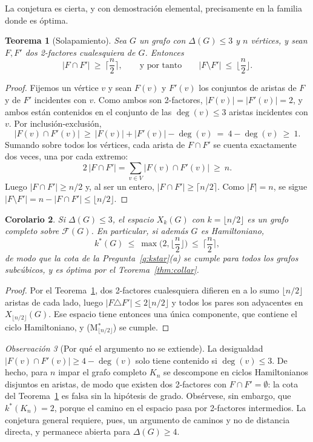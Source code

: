 \documentclass[11pt,a4paper]{article}
\newtheorem{teorema}{Teorema}[section]
\newtheorem{corolario}[teorema]{Corolario}
\theoremstyle{definition}
\theoremstyle{remark}
\newtheorem{observacion}[teorema]{Observación}
\begin{document}
La conjetura es cierta, y con demostración elemental, precisamente en la familia donde es óptima.

\begin{teorema}[Solapamiento]\label{thm:solape}
Sea $G$ un grafo con $\Delta(G)\le3$ y $n$ vértices, y sean $F,F'$ dos 2-factores cualesquiera de $G$. Entonces
\[
|F\cap F'|\ \ge\ \Big\lceil \frac n2\Big\rceil,
\qquad\text{y por tanto}\qquad
|F\setminus F'|\ \le\ \Big\lfloor \frac n2\Big\rfloor .
\]
\end{teorema}

\begin{proof}
Fijemos un vértice $v$ y sean $F(v)$ y $F'(v)$ los conjuntos de aristas de $F$ y de $F'$ incidentes con $v$. Como ambos son 2-factores, $|F(v)|=|F'(v)|=2$, y ambos están contenidos en el conjunto de las $\deg(v)\le3$ aristas incidentes con $v$. Por inclusión-exclusión,
\[
|F(v)\cap F'(v)|\ \ge\ |F(v)|+|F'(v)|-\deg(v)\ =\ 4-\deg(v)\ \ge\ 1 .
\]
Sumando sobre todos los vértices, cada arista de $F\cap F'$ se cuenta exactamente dos veces, una por cada extremo:
\[
2\,|F\cap F'|=\sum_{v\in V}|F(v)\cap F'(v)|\ \ge\ n .
\]
Luego $|F\cap F'|\ge n/2$ y, al ser un entero, $|F\cap F'|\ge\lceil n/2\rceil$. Como $|F|=n$, se sigue $|F\setminus F'|=n-|F\cap F'|\le\lfloor n/2\rfloor$.
\end{proof}

\begin{corolario}\label{cor:subcubico}
Si $\Delta(G)\le3$, el espacio $X_k(G)$ con $k=\lfloor n/2\rfloor$ es un grafo completo sobre $\mathcal{F}(G)$. En particular, si además $G$ es Hamiltoniano,
\[
k^*(G)\ \le\ \max\Big(2,\Big\lfloor\frac n2\Big\rfloor\Big)\ \le\ \Big\lceil\frac n2\Big\rceil ,
\]
de modo que la cota de la Pregunta~\ref{q:kstar}(a) se cumple para todos los grafos subcúbicos, y es óptima por el Teorema~\ref{thm:collar}.
\end{corolario}

\begin{proof}
Por el Teorema~\ref{thm:solape}, dos 2-factores cualesquiera difieren en a lo sumo $\lfloor n/2\rfloor$ aristas de cada lado, luego $|F\triangle F'|\le2\lfloor n/2\rfloor$ y todos los pares son adyacentes en $X_{\lfloor n/2\rfloor}(G)$. Ese espacio tiene entonces una única componente, que contiene el ciclo Hamiltoniano, y (M$^*_{\lfloor n/2\rfloor}$) se cumple.
\end{proof}

\begin{observacion}[Por qué el argumento no se extiende]
La desigualdad $|F(v)\cap F'(v)|\ge4-\deg(v)$ solo tiene contenido si $\deg(v)\le3$. De hecho, para $n$ impar el grafo completo $K_n$ se descompone en ciclos Hamiltonianos disjuntos en aristas, de modo que existen dos 2-factores con $F\cap F'=\emptyset$: la cota del Teorema~\ref{thm:solape} es falsa sin la hipótesis de grado. Obsérvese, sin embargo, que $k^*(K_n)=2$, porque el camino en el espacio pasa por 2-factores intermedios. La conjetura general requiere, pues, un argumento de caminos y no de distancia directa, y permanece abierta para $\Delta(G)\ge4$.
\end{observacion}
\end{document}
